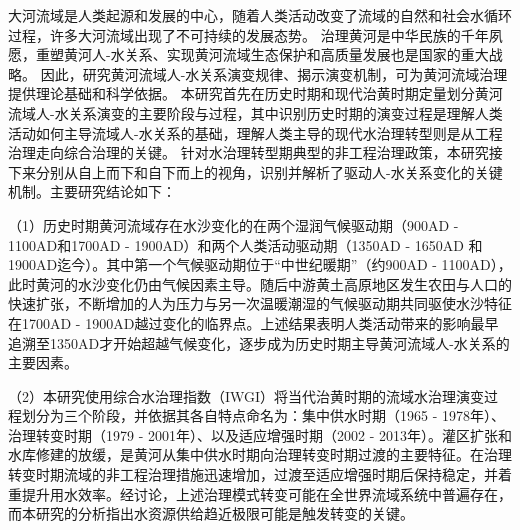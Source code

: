 \begin{cabstract}



大河流域是人类起源和发展的中心，随着人类活动改变了流域的自然和社会水循环过程，许多大河流域出现了不可持续的发展态势。
治理黄河是中华民族的千年夙愿，重塑黄河人-水关系、实现黄河流域生态保护和高质量发展也是国家的重大战略。
因此，研究黄河流域人-水关系演变规律、揭示演变机制，可为黄河流域治理提供理论基础和科学依据。
本研究首先在历史时期和现代治黄时期定量划分黄河流域人-水关系演变的主要阶段与过程，其中识别历史时期的演变过程是理解人类活动如何主导流域人-水关系的基础，理解人类主导的现代水治理转型则是从工程治理走向综合治理的关键。
针对水治理转型期典型的非工程治理政策，本研究接下来分别从自上而下和自下而上的视角，识别并解析了驱动人-水关系变化的关键机制。主要研究结论如下：

（1）历史时期黄河流域存在水沙变化的在两个湿润气候驱动期（900AD - 1100AD和1700AD - 1900AD）和两个人类活动驱动期（1350AD - 1650AD 和 1900AD迄今）。其中第一个气候驱动期位于“中世纪暖期”（约900AD - 1100AD），此时黄河的水沙变化仍由气候因素主导。随后中游黄土高原地区发生农田与人口的快速扩张，不断增加的人为压力与另一次温暖潮湿的气候驱动期共同驱使水沙特征在1700AD - 1900AD越过变化的临界点。上述结果表明人类活动带来的影响最早追溯至1350AD才开始超越气候变化，逐步成为历史时期主导黄河流域人-水关系的主要因素。

（2）本研究使用综合水治理指数（IWGI）将当代治黄时期的流域水治理演变过程划分为三个阶段，并依据其各自特点命名为：集中供水时期（1965 - 1978年）、治理转变时期（1979 - 2001年）、以及适应增强时期（2002 - 2013年）。灌区扩张和水库修建的放缓，是黄河从集中供水时期向治理转变时期过渡的主要特征。在治理转变时期流域的非工程治理措施迅速增加，过渡至适应增强时期后保持稳定，并着重提升用水效率。经讨论，上述治理模式转变可能在全世界流域系统中普遍存在，而本研究的分析指出水资源供给趋近极限可能是触发转变的关键。


\end{cabstract}
